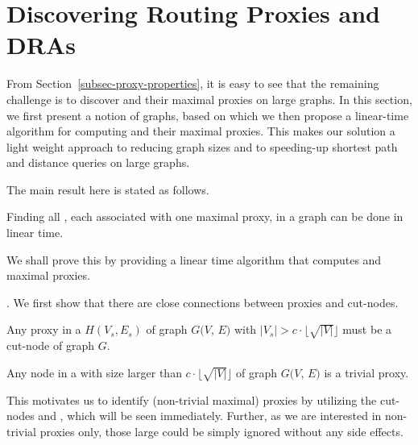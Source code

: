 \section{Discovering Routing Proxies and DRAs}
\label{sec-proxy-algorithms}
From Section~\ref{subsec-proxy-properties}, it is easy to see that the remaining challenge is to discover \dras and their maximal proxies on large graphs.
In this section, we first present a notion of  \bcsketch graphs, based on which we then propose a linear-time algorithm  for computing \dras and their maximal proxies. This makes our solution a light weight approach to reducing graph sizes and to  speeding-up shortest  path and distance queries on large graphs.



The main result here is stated as follows.

\begin{theorem}
\label{thm-compute-dras} Finding all \dras, each associated with one maximal proxy, in a graph can be done in linear time.
\end{theorem}


We shall prove this by providing a linear time algorithm that computes \dras and maximal proxies.


. We first show that there are close connections between proxies and cut-nodes.



\begin{prop}
\label{prop-proxy-cut} Any proxy in a \cc $H(V_s, E_s)$ of graph $G(V$, $E)$ with $|V_s|>c\cdot\lfloor\sqrt{|V|}\rfloor$ must be a cut-node of graph $G$.
\end{prop}



\begin{prop}
\label{prop-large-bcc} Any node in a \bc with size larger than $c\cdot\lfloor\sqrt{|V|}\rfloor$ of graph $G(V$, $E)$ is a trivial proxy.
\end{prop}


This motivates us to identify (non-trivial maximal) proxies by utilizing the cut-nodes and \bccs, which will be seen immediately.
Further, as we are interested in non-trivial proxies only, those large \bccs could be simply ignored without any side effects.

